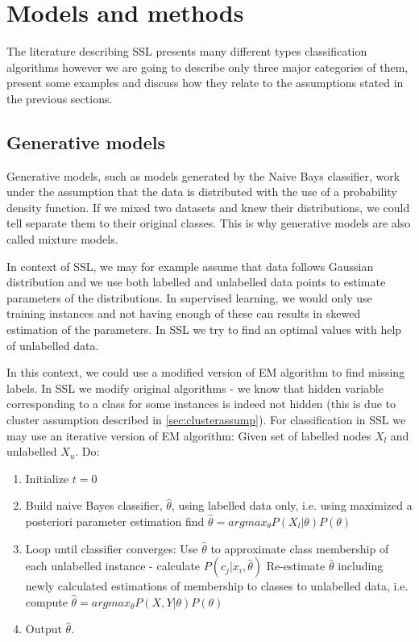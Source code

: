 \documentclass[12pt, a4paper, pdflatex]{report}
\begin{document}
\section{Models and methods}

The literature describing SSL presents many different types classification algorithms\cite{chapelle06,Zhu06semi} however we are going to describe only three major categories of them, present some examples and discuss how they relate to the assumptions stated in the previous sections.

\subsection{Generative models}

Generative models, such as models generated by the Naive Bays classifier, work under the assumption that the data is distributed with the use of a probability density function. If we mixed two datasets and knew their distributions, we could tell separate them to their original classes. This is why generative models are also called mixture models\cite{Zhu06semi}.

In context of SSL, we may for example assume that data follows Gaussian distribution and we use both labelled and unlabelled data points to estimate parameters of the distributions. In supervised learning, we would only use training instances and not having enough of these can results in skewed estimation of the parameters. In SSL we try to find an optimal values with help of unlabelled data.

In this context, we could use a modified version of EM algorithm to find missing labels. In SSL we modify original algorithms - we know that hidden variable corresponding to a class for some instances is indeed not hidden (this is due to cluster assumption described in \ref{sec:clusterassump})\cite{Zhu06semi, chapelle06}. For classification in SSL we may use an iterative version of EM algorithm:
\newline
Given set of labelled nodes $X_l$ and unlabelled $X_u$. Do:
\newline
\begin{enumerate}
\item Initialize $t  = 0 $
\item Build naive Bayes classifier, $ \hat{\theta}$, using labelled data only, i.e. using maximized a posteriori parameter estimation find $ \hat{\theta} = argmax_{\theta} P(X_{l} | \theta)P(\theta) $
\item Loop until classifier converges:
\subitem Use $\hat{\theta}$ to approximate class membership of each unlabelled instance - calculate $ P(c_j|x_i, \hat{\theta})$
\subitem Re-estimate $\hat{\theta}$ including newly calculated estimations of membership to classes to unlabelled data, i.e. compute $ \hat{\theta} = argmax_{\theta} P(X, Y | \theta)P(\theta) $
\item Output $\hat{\theta}$.

\end{enumerate}
\end{document}
